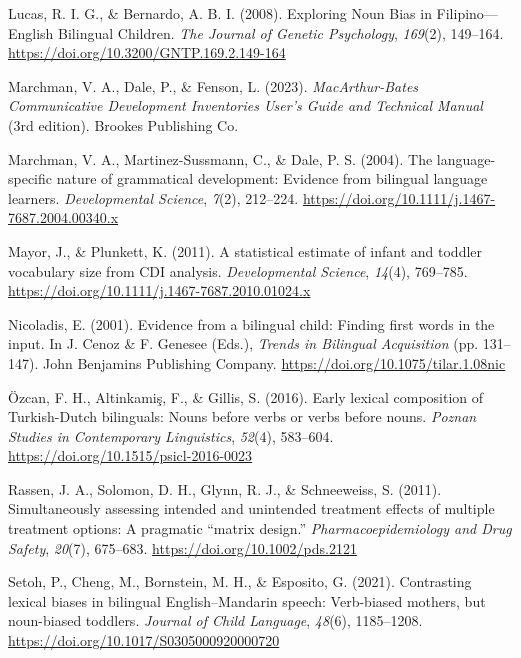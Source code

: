 \documentclass[10pt, letterpaper]{article}
\begin{document}
\begin{CSLReferences}{1}{0}
Lucas, R. I. G., \& Bernardo, A. B. I. (2008). Exploring {Noun Bias} in
{Filipino}---{English Bilingual Children}. \emph{The Journal of Genetic
Psychology}, \emph{169}(2), 149--164.
\url{https://doi.org/10.3200/GNTP.169.2.149-164}

Marchman, V. A., Dale, P., \& Fenson, L. (2023). \emph{{MacArthur-Bates
Communicative Development Inventories User}'s {Guide} and {Technical
Manual}} (3rd edition). Brookes Publishing Co.

Marchman, V. A., Martinez-Sussmann, C., \& Dale, P. S. (2004). The
language-specific nature of grammatical development: Evidence from
bilingual language learners. \emph{Developmental Science}, \emph{7}(2),
212--224. \url{https://doi.org/10.1111/j.1467-7687.2004.00340.x}

Mayor, J., \& Plunkett, K. (2011). A statistical estimate of infant and
toddler vocabulary size from {CDI} analysis. \emph{Developmental
Science}, \emph{14}(4), 769--785.
\url{https://doi.org/10.1111/j.1467-7687.2010.01024.x}

Nicoladis, E. (2001). Evidence from a bilingual child: {Finding} first
words in the input. In J. Cenoz \& F. Genesee (Eds.), \emph{Trends in
{Bilingual Acquisition}} (pp. 131--147). John Benjamins Publishing
Company. \url{https://doi.org/10.1075/tilar.1.08nic}

Özcan, F. H., Altinkamiş, F., \& Gillis, S. (2016). Early lexical
composition of {Turkish-Dutch} bilinguals: {Nouns} before verbs or verbs
before nouns. \emph{Poznan Studies in Contemporary Linguistics},
\emph{52}(4), 583--604. \url{https://doi.org/10.1515/psicl-2016-0023}

Rassen, J. A., Solomon, D. H., Glynn, R. J., \& Schneeweiss, S. (2011).
Simultaneously assessing intended and unintended treatment effects of
multiple treatment options: A pragmatic {``matrix design.''}
\emph{Pharmacoepidemiology and Drug Safety}, \emph{20}(7), 675--683.
\url{https://doi.org/10.1002/pds.2121}

Setoh, P., Cheng, M., Bornstein, M. H., \& Esposito, G. (2021).
Contrasting lexical biases in bilingual {English}--{Mandarin} speech:
{Verb-biased} mothers, but noun-biased toddlers. \emph{Journal of Child
Language}, \emph{48}(6), 1185--1208.
\url{https://doi.org/10.1017/S0305000920000720}


\end{CSLReferences}
\end{document}
